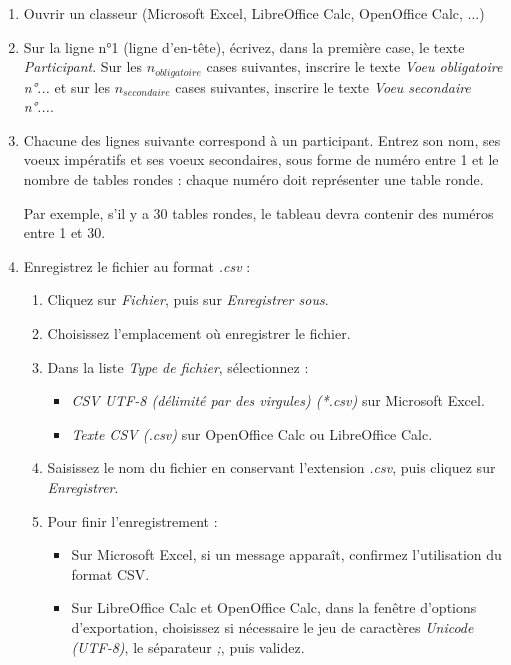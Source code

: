 \documentclass[11pt,a4paper]{article}
\begin{document}
\begin{enumerate}
  \item Ouvrir un classeur (Microsoft Excel, LibreOffice Calc, OpenOffice Calc, ...)
  \item Sur la ligne n°1 (ligne d'en-tête), écrivez, dans la première case, le texte \textit{Participant}. Sur les $n_{obligatoire}$ cases suivantes, inscrire le texte \textit{Voeu obligatoire n°...} et sur les $n_{secondaire}$ cases suivantes, inscrire le texte \textit{Voeu secondaire n°...}.
  \item Chacune des lignes suivante correspond à un participant. Entrez son nom, ses voeux impératifs et ses voeux secondaires, sous forme de numéro entre 1 et le nombre de tables rondes : chaque numéro doit représenter une table ronde. \begin{note} Par exemple, s'il y a 30 tables rondes, le tableau devra contenir des numéros entre 1 et 30. \end{note}
  \item Enregistrez le fichier au format \textit{.csv} :
  \begin{enumerate}
    \item Cliquez sur \textit{Fichier}, puis sur \textit{Enregistrer sous}.
    \item Choisissez l'emplacement où enregistrer le fichier.
    \item Dans la liste \textit{Type de fichier}, sélectionnez :
    \begin{itemize}
      \item \textit{CSV UTF-8 (délimité par des virgules) (*.csv)} sur Microsoft Excel.
      \item \textit{Texte CSV (.csv)} sur OpenOffice Calc ou LibreOffice Calc.
    \end{itemize}
    \item Saisissez le nom du fichier en conservant l'extension \textit{.csv}, puis cliquez sur \textit{Enregistrer}.
    \item Pour finir l'enregistrement :
    \begin{itemize}
      \item Sur Microsoft Excel, si un message apparaît, confirmez l'utilisation du format CSV.
      \item Sur LibreOffice Calc et OpenOffice Calc, dans la fenêtre d'options d'exportation, choisissez si nécessaire le jeu de caractères \textit{Unicode (UTF-8)}, le séparateur \textit{;}, puis validez.
    \end{itemize}
  \end{enumerate}
\end{enumerate}
\end{document}
